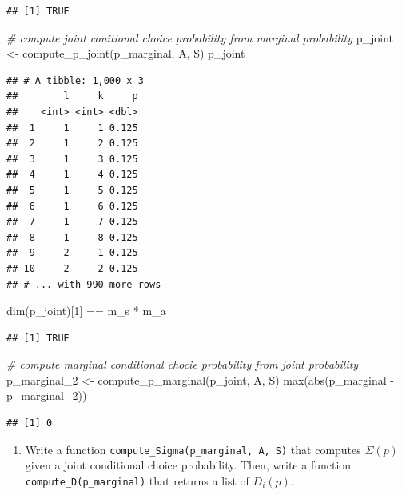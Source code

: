 \documentclass[
]{book}
\newenvironment{Shaded}{\begin{snugshade}}{\end{snugshade}}
\newcommand{\CommentTok}[1]{\textcolor[rgb]{0.56,0.35,0.01}{\textit{#1}}}
\newcommand{\DecValTok}[1]{\textcolor[rgb]{0.00,0.00,0.81}{#1}}
\newcommand{\FunctionTok}[1]{\textcolor[rgb]{0.00,0.00,0.00}{#1}}
\newcommand{\NormalTok}[1]{#1}
\newcommand{\OtherTok}[1]{\textcolor[rgb]{0.56,0.35,0.01}{#1}}
\newcommand{\SpecialCharTok}[1]{\textcolor[rgb]{0.00,0.00,0.00}{#1}}
\providecommand{\tightlist}{%
  \setlength{\itemsep}{0pt}\setlength{\parskip}{0pt}}
\begin{document}
\begin{verbatim}
## [1] TRUE
\end{verbatim}

\begin{Shaded}
\begin{Highlighting}[]
\CommentTok{\# compute joint conitional choice probability from marginal probability}
\NormalTok{p\_joint }\OtherTok{\textless{}{-}} \FunctionTok{compute\_p\_joint}\NormalTok{(p\_marginal, A, S)}
\NormalTok{p\_joint}
\end{Highlighting}
\end{Shaded}

\begin{verbatim}
## # A tibble: 1,000 x 3
##        l     k     p
##    <int> <int> <dbl>
##  1     1     1 0.125
##  2     1     2 0.125
##  3     1     3 0.125
##  4     1     4 0.125
##  5     1     5 0.125
##  6     1     6 0.125
##  7     1     7 0.125
##  8     1     8 0.125
##  9     2     1 0.125
## 10     2     2 0.125
## # ... with 990 more rows
\end{verbatim}

\begin{Shaded}
\begin{Highlighting}[]
\FunctionTok{dim}\NormalTok{(p\_joint)[}\DecValTok{1}\NormalTok{] }\SpecialCharTok{==}\NormalTok{ m\_s }\SpecialCharTok{*}\NormalTok{ m\_a}
\end{Highlighting}
\end{Shaded}

\begin{verbatim}
## [1] TRUE
\end{verbatim}

\begin{Shaded}
\begin{Highlighting}[]
\CommentTok{\# compute marginal conditional chocie probability from joint probability}
\NormalTok{p\_marginal\_2 }\OtherTok{\textless{}{-}} \FunctionTok{compute\_p\_marginal}\NormalTok{(p\_joint, A, S)}
\FunctionTok{max}\NormalTok{(}\FunctionTok{abs}\NormalTok{(p\_marginal }\SpecialCharTok{{-}}\NormalTok{ p\_marginal\_2))}
\end{Highlighting}
\end{Shaded}

\begin{verbatim}
## [1] 0
\end{verbatim}

\begin{enumerate}
\def\labelenumi{\arabic{enumi}.}
\setcounter{enumi}{5}
\tightlist
\item
  Write a function \texttt{compute\_Sigma(p\_marginal,\ A,\ S)} that computes \(\Sigma(p)\) given a joint conditional choice probability. Then, write a function \texttt{compute\_D(p\_marginal)} that returns a list of \(D_i(p)\).
\end{enumerate}
\end{document}
